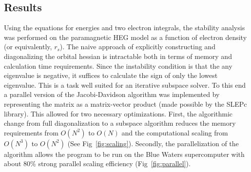 \documentclass{revtex4}
\begin{document}
 \subsection{Results}   
      Using the equations for energies and two electron integrals, the stability analysis was 
      performed on the paramagnetic HEG model as a function of electron density (or equivalently, 
      $r_s$). The naive approach of explicitly constructing and diagonalizing the orbital hessian 
      is intractable both in terms of memory and calculation time requirements. Since the 
      instability condition is that the any eigenvalue is negative, it suffices to calculate the 
      sign of only the lowest eigenvalue. This is a task well suited for an iterative subspace 
      solver. To this end a parallel version of the Jacobi-Davidson algorithm 
      was implemented by representing the matrix as a matrix-vector product (made possible by the 
      SLEPc library\cite{Hernandez2005}). This allowed for two necessary optimizations. First, the 
      algorithmic change from full diagonalization to a subspace algorithm reduces the memory 
      requirements from $O(N^2)$ to $O(N)$ and the computational scaling from $O(N^3)$ to $O(N^2)$ 
      (See Fig~\ref{fig:scaling}). 
      Secondly, the parallelization of the algorithm allows the program to be run on the Blue 
      Waters supercomputer with about 80\% strong parallel scaling efficiency 
      (Fig~\ref{fig:parallel}). 
\end{document}

